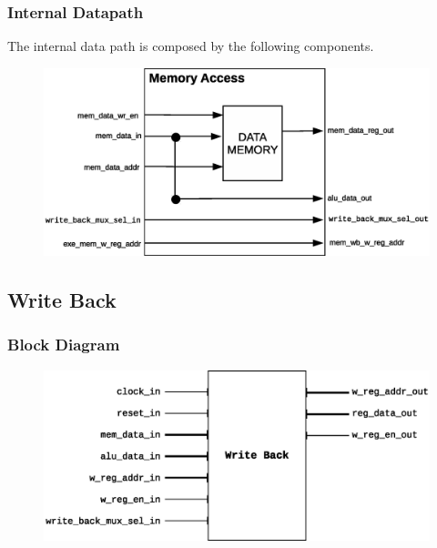 \documentclass{article}
\begin{document}
  \subsubsection{Internal Datapath} 
  The internal data path is composed by the following components.

  \begin{figure}[H]
    \centering
    \includegraphics[width=.8\linewidth]{pictures/datapath/mem_datapath.eps}
  \end{figure}    
  
  \newpage
  \subsection{Write Back}
  \subsubsection{Block Diagram}
  \begin{figure}[H]
    \centering
    \includegraphics[width=\linewidth]{pictures/blocks/wb_block.eps}
  \end{figure} 
\end{document}
